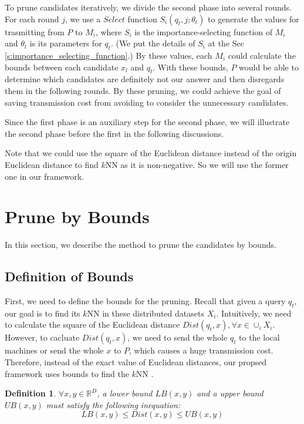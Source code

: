 To prune candidates iteratively, we divide the second phase into several rounds.  For each round $j$, we use a $Select$ function $S_i(q_t,j;\theta_t)$ to generate the values for trasmitting from $P$ to $M_i$, where $S_i$ is the importance-selecting function of $M_i$ and $\theta_t$ is its parameters for $q_t$.  (We put the details of $S_i$ at the Sec \ref{s:importance_selecting_function}.)  By these values, each $M_i$ could calculate the bounds between each candidate $x_l$ and $q_t$.  With these bounds, $P$ would be able to determine which candidates are definitely not our answer and then disregards them in the following rounds.  By these pruning, we could achieve the goal of saving transmission cost from avoiding to consider the unnecessary candidates.

Since the first phase is an auxiliary step for the second phase, we will illustrate the second phase before the first in the following discussions.  

Note that we could use the square of the Euclidean distance instead of the origin Euclidean distance to find $k$NN as it is non-negative.  So we will use the former one in our framework.

\section{Prune by Bounds}
\label{s:prune}
In this section, we describe the method to prune the candidates by bounds.

\subsection{Definition of Bounds} %
\label{ss:definition_of_bounds}

First, we need to define the bounds for the pruning.  Recall that given a query $q_t$, our goal is to find its $k$NN in these distributed datasets $X_i$.  Intuitively, we need to calculate the square of the Euclidean distance $Dist(q_t,x), \forall x\in \cup_i X_i$.  However, to cacluate $Dist(q_t,x)$, we need to send the whole $q_t$ to the local machines or send the whole $x$ to $P$, which causes a huge transmission cost.  Therefore, instead of the exact value of Euclidean distances, our propsed framework uses bounds to find the $k$NN .

\newtheorem{Bounds}{\bf Definition}
\begin{Bounds}
$\forall x,y \in \mathbb{R}^D$, a lower bound $LB(x,y)$ and a upper bound $UB(x,y)$ must satisfy the following inequation:
\[
LB(x,y)\leq Dist(x,y) \leq UB(x,y)
\]
\end{Bounds}


